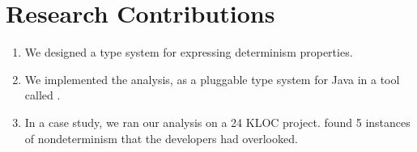 \section{Research Contributions\label{sec:contributions}}
\begin{enumerate}
  \item We designed a type system for expressing determinism properties.

  \item We implemented the analysis, as a pluggable type system for Java in a
    tool called \theDeterminismChecker.

  \item In a case study, we ran our analysis on a 24 KLOC project.
    \TheDeterminismChecker
    found 5 instances of nondeterminism that the developers had
    overlooked.
\end{enumerate}


